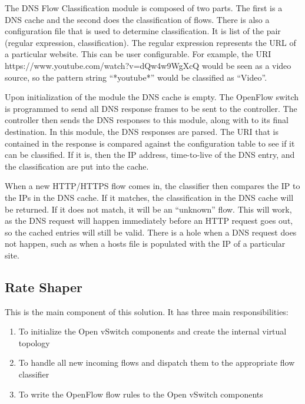 The DNS Flow Classification module is composed of two parts. The first is a DNS cache and the second does the classification of flows. There is also a configuration file that is used to determine classification. It is list of the pair (regular expression, classification). The regular expression represents the URL of a particular website. This can be user configurable. For example, the URI \linebreak https://www.youtube.com/watch?v=dQw4w9WgXcQ \linebreak would be seen as a video source, so the pattern string \linebreak``*youtube*'' would be classified as ``Video''. 

Upon initialization of the module the DNS cache is empty. The OpenFlow switch is programmed to send all DNS response frames to be sent to the controller. The controller then sends the DNS responses to this module, along with to its final destination. In this module, the DNS responses are parsed. The URI that is contained in the response is compared against the configuration table to see if it can be classified. If it is, then the IP address, time-to-live of the DNS entry, and the classification are put into the cache. 

When a new HTTP/HTTPS flow comes in, the classifier then compares the IP to the IPs in the DNS cache. If it matches, the classification in the DNS cache will be returned. If it does not match, it will be an ``unknown'' flow. This will work, as the DNS request will happen immediately before an HTTP request goes out, so the cached entries will still be valid. There is a hole when a DNS request does not happen, such as when a hosts file is populated with the IP of a particular site. 


\subsection{Rate Shaper}
This is the main component of this solution. It has three main responsibilities: 
\begin{enumerate}
  \item To initialize the Open vSwitch components and create the internal virtual topology
  \item To handle all new incoming flows and dispatch them to the appropriate flow classifier
  \item To write the OpenFlow flow rules to the Open vSwitch components
\end{enumerate}

